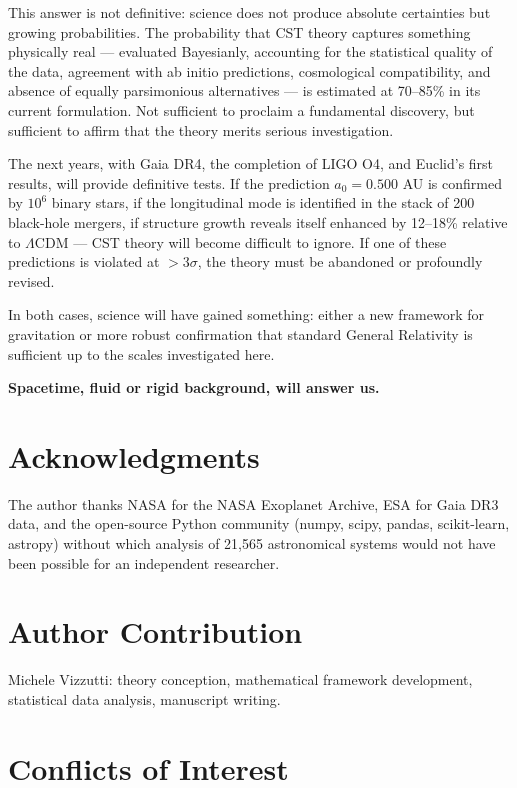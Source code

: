 \documentclass[11pt,a4paper]{article}
\begin{document}
This answer is not definitive: science does not produce absolute
certainties but growing probabilities. The probability that CST theory
captures something physically real --- evaluated Bayesianly, accounting
for the statistical quality of the data, agreement with ab initio
predictions, cosmological compatibility, and absence of equally
parsimonious alternatives --- is estimated at 70--85\% in its current
formulation. Not sufficient to proclaim a fundamental discovery, but
sufficient to affirm that the theory merits serious investigation.

The next years, with Gaia DR4, the completion of LIGO O4, and Euclid's
first results, will provide definitive tests. If the prediction
\(a_0 = 0.500\) AU is confirmed by \(10^6\) binary stars, if the
longitudinal mode is identified in the stack of 200 black-hole mergers,
if structure growth reveals itself enhanced by 12--18\% relative to
\(\Lambda\)CDM --- CST theory will become difficult to ignore. If one of
these predictions is violated at \(> 3\sigma\), the theory must be
abandoned or profoundly revised.

In both cases, science will have gained something: either a new
framework for gravitation or more robust confirmation that standard
General Relativity is sufficient up to the scales investigated here.

\textbf{Spacetime, fluid or rigid background, will answer us.}

\hypertarget{acknowledgments}{%
\section*{Acknowledgments}\label{acknowledgments}}

The author thanks NASA for the NASA Exoplanet Archive, ESA for Gaia DR3
data, and the open-source Python community (numpy, scipy, pandas,
scikit-learn, astropy) without which analysis of 21,565 astronomical
systems would not have been possible for an independent researcher.

\hypertarget{author-contribution}{%
\section*{Author Contribution}\label{author-contribution}}

Michele Vizzutti: theory conception, mathematical framework development, statistical data analysis, manuscript writing.

\hypertarget{conflicts-of-interest}{%
\section*{Conflicts of Interest}\label{conflicts-of-interest}}
\end{document}
